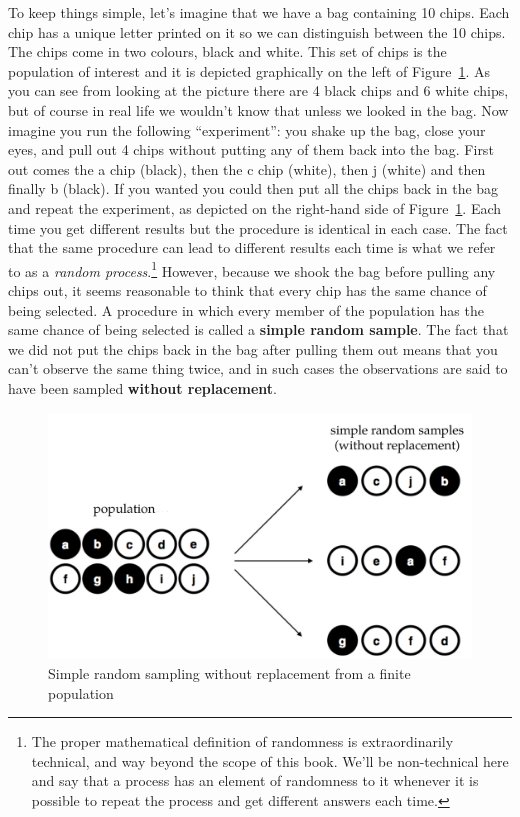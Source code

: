 \documentclass[
  a4paper,
]{book}
\begin{document}
To keep things simple, let's imagine that we have a bag containing 10
chips. Each chip has a unique letter printed on it so we can distinguish
between the 10 chips. The chips come in two colours, black and white.
This set of chips is the population of interest and it is depicted
graphically on the left of Figure~\ref{fig-fig8-1}. As you can see from
looking at the picture there are 4 black chips and 6 white chips, but of
course in real life we wouldn't know that unless we looked in the bag.
Now imagine you run the following ``experiment'': you shake up the bag,
close your eyes, and pull out 4 chips without putting any of them back
into the bag. First out comes the a chip (black), then the c chip
(white), then j (white) and then finally b (black). If you wanted you
could then put all the chips back in the bag and repeat the experiment,
as depicted on the right-hand side of Figure~\ref{fig-fig8-1}. Each time
you get different results but the procedure is identical in each case.
The fact that the same procedure can lead to different results each time
is what we refer to as a \emph{random process}.\footnote{The proper
  mathematical definition of randomness is extraordinarily technical,
  and way beyond the scope of this book. We'll be non-technical here and
  say that a process has an element of randomness to it whenever it is
  possible to repeat the process and get different answers each time.}
However, because we shook the bag before pulling any chips out, it seems
reasonable to think that every chip has the same chance of being
selected. A procedure in which every member of the population has the
same chance of being selected is called a \textbf{simple random sample}.
The fact that we did not put the chips back in the bag after pulling
them out means that you can't observe the same thing twice, and in such
cases the observations are said to have been sampled \textbf{without
replacement}.

\begin{figure}

\includegraphics[width=1\textwidth,height=\textheight]{images/fig8-1.png} \hfill{}

\caption{\label{fig-fig8-1}Simple random sampling without replacement
from a finite population}

\end{figure}
\end{document}
